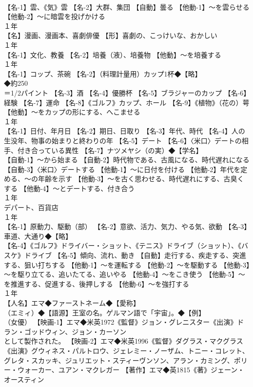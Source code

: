 \documentclass[8pt]{extreport}
\begin{document}
\begin{CJK}{UTF8}{min}
\\	【名-1】雲、《気》雲 【名-2】大群、集団 【自動】曇る 【他動-1】～を雲らせる 【他動-2】～に暗雲を投げかける
\\	１年	
\\	【名】漫画、漫画本、喜劇俳優 【形】喜劇の、こっけいな、おかしい
\\	１年	
\\	【名-1】文化、教養 【名-2】培養（液）、培養物 【他動】～を培養する
\\	１年	
\\	【名-1】コップ、茶碗 【名-2】（料理計量用）カップ1杯◆【略】
\\	◆約250
\\	＝1/2パイント 【名-3】酒 【名-4】優勝杯 【名-5】ブラジャーのカップ 【名-6】経験 【名-7】運命 【名-8】《ゴルフ》カップ、ホール 【名-9】《植物》（花の）萼 【他動】～をカップの形にする、へこませる
\\	１年	
\\	【名-1】日付、年月日 【名-2】期日、日取り 【名-3】年代、時代 【名-4】人の生没年、物事の始まりと終わりの年 【名-5】デート 【名-6】〈米口〉デートの相手、付き合っている異性 【名-7】ナツメヤシ（の実）◆【学名】
\\	【自動-1】～から始まる 【自動-2】時代物である、古風になる、時代遅れになる 【自動-3】〈米口〉デートする 【他動-1】～に日付を付ける 【他動-2】年代を定める、～の年齢を示す 【他動-3】～を古く思わせる、時代遅れにする、古臭くする 【他動-4】～とデートする、付き合う
\\	１年	
\\	デパート、百貨店
\\	１年	
\\	【名-1】原動力、駆動（部） 【名-2】意欲、活力、気力、やる気、欲動 【名-3】車道、大通り◆【略】
\\	【名-4】《ゴルフ》ドライバー・ショット、《テニス》ドライブ（ショット）、《バスケ》ドライブ 【名-5】傾向、流れ、動き 【自動】走行する、疾走する、突進する、狙い打ちする 【他動-1】～を運転する 【他動-2】～を駆動する 【他動-3】～を駆り立てる、追いたてる、追いやる 【他動-4】～をこき使う 【他動-5】～を推進する、促進する、後押しする 【他動-6】～を強打する
\\	１年	
\\	【人名】エマ◆ファーストネーム◆【愛称】
\\	（エミィ）◆【語源】王室の名。ゲルマン語で「宇宙」。◆【例】
\\	（女優） 【映画-1】エマ◆米英1972《監督》ジョン・グレニスター《出演》ドラン・ゴッドウィン、ジョン・カーソン
\\	として製作された。 【映画-2】エマ◆米英1996《監督》ダグラス・マクグラス《出演》グウィネス・パルトロウ、ジェレミー・ノーザム、トニー・コレット、グレタ・スカッキ、ジュリエット・スティーヴンソン、アラン・カミング、ポリー・ウォーカー、ユアン・マクレガー 【著作】エマ◆英1815《著》ジェーン・オースティン

\end{CJK}
\end{document}
